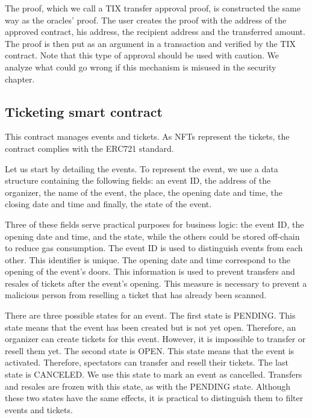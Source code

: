 \documentclass[a4paper,11pt,oneside]{report}
\begin{document}
The proof, which we call a TIX transfer approval proof, is constructed the same way as the oracles' proof. The user creates the proof with the address of the approved contract, his address, the recipient address and the transferred amount. The proof is then put as an argument in a transaction and verified by the TIX contract. Note that this type of approval should be used with caution. We analyze what could go wrong if this mechanism is misused in the security chapter.

\subsection{Ticketing smart contract}
This contract manages events and tickets. As NFTs represent the tickets, the contract complies with the ERC721 standard.

Let us start by detailing the events. To represent the event, we use a data structure containing the following fields: an event ID, the address of the organizer, the name of the event, the place, the opening date and time, the closing date and time and finally, the state of the event. 

Three of these fields serve practical purposes for business logic: the event ID, the opening date and time, and the state, while the others could be stored off-chain to reduce gas consumption. The event ID is used to distinguish events from each other. This identifier is unique. The opening date and time correspond to the opening of the event's doors. This information is used to prevent transfers and resales of tickets after the event's opening. This measure is necessary to prevent a malicious person from reselling a ticket that has already been scanned.

There are three possible states for an event. The first state is PENDING. This state means that the event has been created but is not yet open. Therefore, an organizer can create tickets for this event. However, it is impossible to transfer or resell them yet. The second state is OPEN. This state means that the event is activated. Therefore, spectators can transfer and resell their tickets. The last state is CANCELED. We use this state to mark an event as cancelled. Transfers and resales are frozen with this state, as with the PENDING state. Although these two states have the same effects, it is practical to distinguish them to filter events and tickets.
\end{document}
